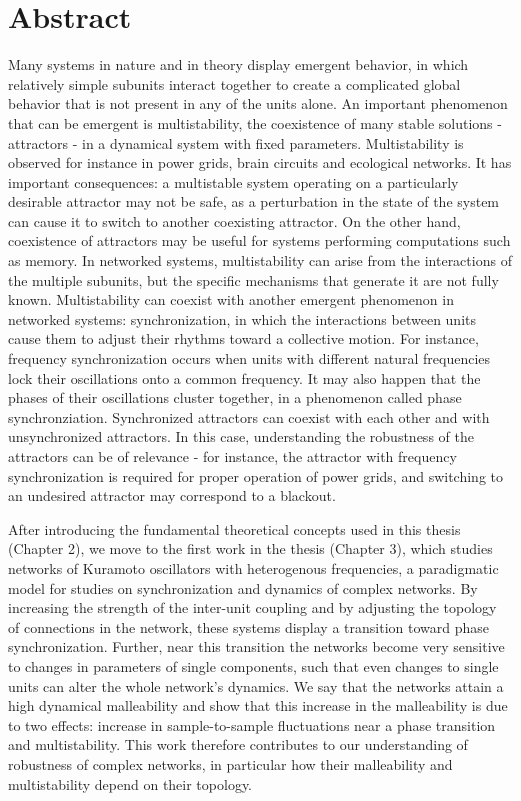 \section*{Abstract}

Many systems in nature and in theory display emergent behavior, in which relatively simple subunits interact together to create a complicated global behavior that is not present in any of the units alone. An important phenomenon that can be emergent is multistability, the coexistence of many stable solutions - attractors - in a dynamical system with fixed parameters. Multistability is observed for instance in power grids, brain circuits and ecological networks. It has important consequences: a multistable system operating on a particularly desirable attractor may not be safe, as a perturbation in the state of the system can cause it to switch to another coexisting attractor. On the other hand, coexistence of attractors may be useful for systems performing computations such as memory. In networked systems, multistability can arise from the interactions of the multiple subunits, but the specific mechanisms that generate it are not fully known. Multistability can coexist with another emergent phenomenon in networked systems: synchronization, in which the interactions between units cause them to adjust their rhythms toward a collective motion. For instance, frequency synchronization occurs when units with different natural frequencies lock their oscillations onto a common frequency. It may also happen that the phases of their oscillations cluster together, in a phenomenon called phase synchronziation.  Synchronized attractors can coexist with each other and with unsynchronized attractors. In this case, understanding the robustness of the attractors can be of relevance - for instance, the attractor with frequency synchronization is required for proper operation of power grids, and switching to an undesired attractor may correspond to a blackout. 

After introducing the fundamental theoretical concepts used in this thesis (Chapter 2), we move to the first work in the thesis (Chapter 3), which studies networks of Kuramoto oscillators with heterogenous frequencies, a paradigmatic model for studies on synchronization and dynamics of complex networks. By increasing the strength of the inter-unit coupling and by adjusting the topology of connections in the network, these systems display a transition toward phase synchronization. Further, near this transition the networks become very sensitive to changes in parameters of single components, such that even changes to single units can alter the whole network's dynamics. We say that the networks attain a high dynamical malleability and show that this increase in the malleability is due to two effects: increase in sample-to-sample fluctuations near a phase transition and multistability. This work therefore contributes to our understanding of robustness of complex networks, in particular how their malleability and multistability depend on their topology. 

